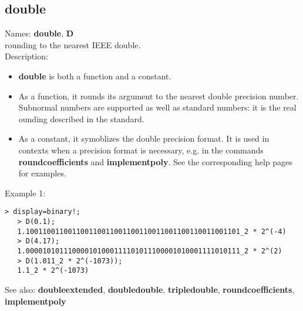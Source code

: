 \subsection{ double }
\noindent Names: \textbf{double}, \textbf{D}\\
rounding to the nearest IEEE double.\\

\noindent Description: \begin{itemize}

\item \textbf{double} is both a function and a constant.

\item As a function, it rounds its argument to the nearest double precision number.
   Subnormal numbers are supported as well as standard numbers: it is the real
   ounding described in the standard.

\item As a constant, it symoblizes the double precision format. It is used in 
   contexts when a precision format is necessary, e.g. in the commands 
   \textbf{roundcoefficients} and \textbf{implementpoly}.
   See the corresponding help pages for examples.
\end{itemize}
\noindent Example 1: 
\begin{center}\begin{minipage}{14.8cm}\begin{Verbatim}[frame=single]
   > display=binary!;
   > D(0.1);
   1.100110011001100110011001100110011001100110011001101_2 * 2^(-4)
   > D(4.17);
   1.000010101110000101000111101011100001010001111010111_2 * 2^(2)
   > D(1.011_2 * 2^(-1073));
   1.1_2 * 2^(-1073)
\end{Verbatim}
\end{minipage}\end{center}
See also: \textbf{doubleextended}, \textbf{doubledouble}, \textbf{tripledouble}, \textbf{roundcoefficients}, \textbf{implementpoly}
